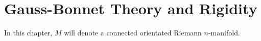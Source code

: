 \documentclass[../main]{subfiles}
\begin{document}
\chapter{Gauss-Bonnet Theory and Rigidity}\label{ch08}
In this chapter, $M$ will denote a connected orientated Riemann $n$-manifold.







\end{document}
